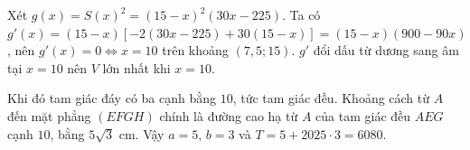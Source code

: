 \begin{ex}
{Xét $g(x)=S(x)^2=(15-x)^2(30x-225)$. Ta có $g'(x)=(15-x)\left[-2(30x-225)+30(15-x)\right]=(15-x)(900-90x)$, nên $g'(x)=0\Leftrightarrow x=10$ trên khoảng $(7{,}5;15)$. $g'$ đổi dấu từ dương sang âm tại $x=10$ nên $V$ lớn nhất khi $x=10$.

Khi đó tam giác đáy có ba cạnh bằng $10$, tức tam giác đều. Khoảng cách từ $A$ đến mặt phẳng $(EFGH)$ chính là đường cao hạ từ $A$ của tam giác đều $AEG$ cạnh $10$, bằng $5\sqrt3$ cm. Vậy $a=5$, $b=3$ và $T=5+2025\cdot3=6080$.}
\end{ex}
